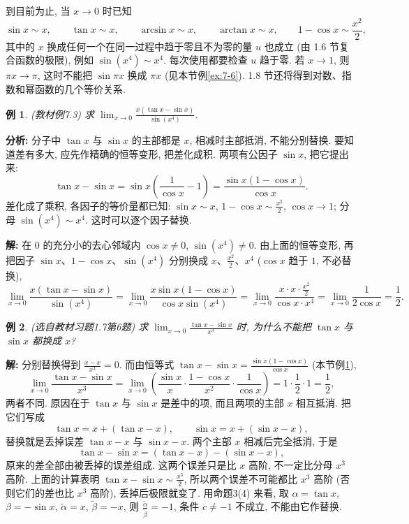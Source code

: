 \documentclass[UTF8,openany]{ctexbook}
\theoremstyle{chinesetextbook}
\newtheorem{example}{例}[section]
\newenvironment{cnsolution}{\par\indent\textbf{解:} \ignorespaces}{\par}
\begin{document}
到目前为止, 当 $x\to0$ 时已知
\[
\sin x\sim x,\qquad\tan x\sim x,\qquad\arcsin x\sim x,\qquad\arctan x\sim x,\qquad1-\cos x\sim\frac{x^2}2,
\]
其中的 $x$ 换成任何一个在同一过程中趋于零且不为零的量 $u$ 也成立 (由 1.6 节复合函数的极限), 例如 $\sin(x^4)\sim x^4$. 每次使用都要检查 $u$ 趋于零. 若 $x\to1$, 则 $\pi x\to\pi$, 这时不能把 $\sin\pi x$ 换成 $\pi x$ (见本节例\ref{ex:7-6}). 1.8 节还将得到对数、指数和幂函数的几个等价关系.
\begin{example}\label{ex:7-3}
\textnormal{(教材例7.3)} 求 $\displaystyle\lim_{x\to0}\frac{x(\tan x-\sin x)}{\sin(x^4)}$.
\end{example}
\par\indent\textbf{分析:} 分子中 $\tan x$ 与 $\sin x$ 的主部都是 $x$, 相减时主部抵消, 不能分别替换. 要知道差有多大, 应先作精确的恒等变形, 把差化成积. 两项有公因子 $\sin x$, 把它提出来:
\[
\tan x-\sin x=\sin x\left(\frac1{\cos x}-1\right)=\frac{\sin x(1-\cos x)}{\cos x}.
\]
差化成了乘积, 各因子的等价量都已知: $\sin x\sim x$, $\displaystyle1-\cos x\sim\frac{x^2}2$, $\cos x\to1$; 分母 $\sin(x^4)\sim x^4$. 这时可以逐个因子替换.
\begin{cnsolution}
在 $0$ 的充分小的去心邻域内 $\cos x\ne0$, $\sin(x^4)\ne0$. 由上面的恒等变形, 再把因子 $\sin x$、$1-\cos x$、$\sin(x^4)$ 分别换成 $x$、$\displaystyle\frac{x^2}2$、$x^4$ ($\cos x$ 趋于 $1$, 不必替换),
\[
\lim_{x\to0}\frac{x(\tan x-\sin x)}{\sin(x^4)}=\lim_{x\to0}\frac{x\sin x(1-\cos x)}{\cos x\sin(x^4)}=\lim_{x\to0}\frac{x\cdot x\cdot\frac{x^2}2}{\cos x\cdot x^4}=\lim_{x\to0}\frac1{2\cos x}=\frac12.
\]
\end{cnsolution}
\begin{example}\label{ex:h17-6}
\textnormal{(选自教材习题1.7第6题)} 求 $\displaystyle\lim_{x\to0}\frac{\tan x-\sin x}{x^3}$ 时, 为什么不能把 $\tan x$ 与 $\sin x$ 都换成 $x$?
\end{example}
\begin{cnsolution}
分别替换得到 $\displaystyle\frac{x-x}{x^3}=0$. 而由恒等式 $\displaystyle\tan x-\sin x=\frac{\sin x(1-\cos x)}{\cos x}$ (本节例\ref{ex:7-3}),
\[
\lim_{x\to0}\frac{\tan x-\sin x}{x^3}=\lim_{x\to0}\left(\frac{\sin x}x\cdot\frac{1-\cos x}{x^2}\cdot\frac1{\cos x}\right)=1\cdot\frac12\cdot1=\frac12,
\]
两者不同. 原因在于 $\tan x$ 与 $\sin x$ 是差中的项, 而且两项的主部 $x$ 相互抵消. 把它们写成
\[
\tan x=x+(\tan x-x),\qquad\sin x=x+(\sin x-x),
\]
替换就是丢掉误差 $\tan x-x$ 与 $\sin x-x$. 两个主部 $x$ 相减后完全抵消, 于是
\[
\tan x-\sin x=(\tan x-x)-(\sin x-x),
\]
原来的差全部由被丢掉的误差组成. 这两个误差只是比 $x$ 高阶, 不一定比分母 $x^3$ 高阶. 上面的计算表明 $\displaystyle\tan x-\sin x\sim\frac{x^3}2$, 所以两个误差不可能都比 $x^3$ 高阶 (否则它们的差也比 $x^3$ 高阶), 丢掉后极限就变了. 用命题3(4) 来看, 取 $\alpha=\tan x$, $\beta=-\sin x$, $\widetilde\alpha=x$, $\widetilde\beta=-x$, 则 $\displaystyle\frac{\widetilde\alpha}{\widetilde\beta}=-1$, 条件 $c\ne-1$ 不成立, 不能由它作替换.
\end{cnsolution}
\end{document}
